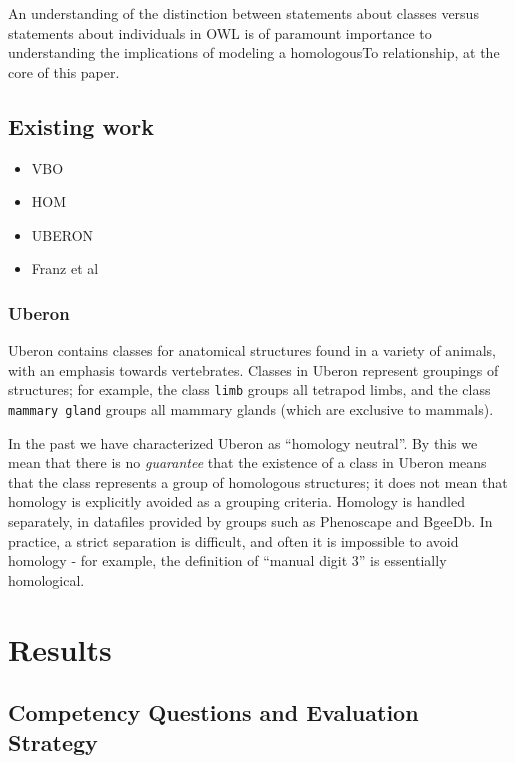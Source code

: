An understanding of the distinction between statements about classes
versus statements about individuals in OWL is of paramount importance to
understanding the implications of modeling a homologousTo relationship,
at the core of this paper.

\subsection{Existing work}\label{existing-work}

\begin{itemize}
\itemsep1pt\parskip0pt
\item
  VBO
\item
  HOM
\item
  UBERON
\item
  Franz et al
\end{itemize}

\subsubsection{Uberon}\label{uberon}

Uberon contains classes for anatomical structures found in a variety of
animals, with an emphasis towards vertebrates. Classes in Uberon
represent groupings of structures; for example, the class \texttt{limb}
groups all tetrapod limbs, and the class \texttt{mammary gland} groups
all mammary glands (which are exclusive to mammals).

In the past we have characterized Uberon as ``homology neutral''. By
this we mean that there is no \emph{guarantee} that the existence of a
class in Uberon means that the class represents a group of homologous
structures; it does not mean that homology is explicitly avoided as a
grouping criteria. Homology is handled separately, in datafiles provided
by groups such as Phenoscape and BgeeDb. In practice, a strict
separation is difficult, and often it is impossible to avoid homology -
for example, the definition of ``manual digit 3'' is essentially
homological.

\section{Results}\label{results}

\subsection{Competency Questions and Evaluation
Strategy}\label{competency-questions-and-evaluation-strategy}

